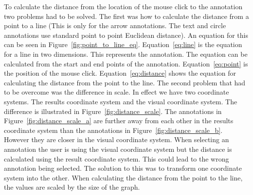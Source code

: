 To calculate the distance from the location of the mouse click to the annotation two problems had to be solved.  The first was how to calculate the distance from a point to a line (This is only for the arrow annotations.  The text and circle annotations use standard point to point Euclidean distance).  An equation for this can be seen in Figure~\ref{fig:point_to_line_eq}.  Equation~\ref{eq:line} is the equation for a line in two dimensions.  This represents the annotation.  The equation can be calculated from the start and end points of the annotation. Equation~\ref{eq:point} is the position of the mouse click.  Equation~\ref{eq:distance} shows the equation for calculating the distance from the point to the line.  The second problem that had to be overcome was the difference in scale.  In effect we have two coordinate systems.  The results coordinate system and the visual coordinate system.  The difference is illustrated in Figure~\ref{fig:distance_scale}.  The annotations in Figure~\ref{fig:distance_scale_a} are further away from each other in the results coordinate system than the annotations in Figure~\ref{fig:distance_scale_b}. However they are closer in the visual coordinate system.  When selecting an annotation the user is using the visual coordinate system but the distance is calculated using the result coordinate system.  This could lead to the wrong annotation being selected.  The solution to this was to transform one coordinate system into the other.  When calculating the distance from the point to the line, the values are scaled by the size of the graph.

